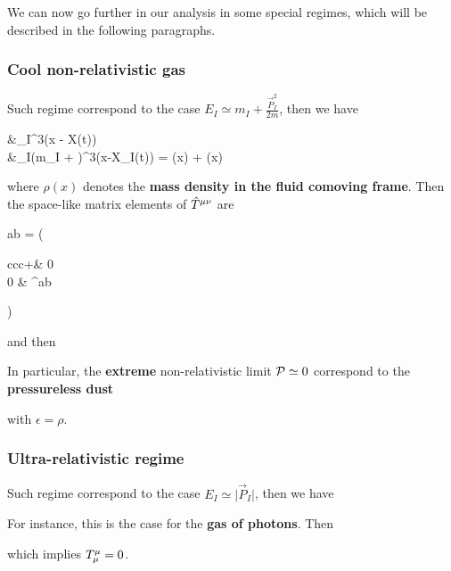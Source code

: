\documentclass[../main/main.tex]{subfiles}
\begin{document}
We can now go further in our analysis in some special regimes, which will be described in the following paragraphs.

\subsubsection{Cool non-relativistic gas}

\newcommand{\nRel}{\text{\tiny non-rel}}
\newcommand{\Dust}{\text{\tiny dust}}

Such regime correspond to the case $E_I \simeq m_I+\frac{\vec P_I^2}{2m}$, then we have
\begin{eqalign}
	\press &\simeq {}\sum_I\delta^3(\hat x - \hat X(t))\\
	\epsilon &\simeq \sum_I(m_I + )\delta^3(x-\hat X_I(t)) = \rho(x) + \press(x)
\end{eqalign}
where $\rho(x)$ denotes the \textbf{mass density in the fluid comoving frame}. Then the space-like matrix elements of $\hat T^{\mu \nu}$ are
\begin{eqalign}
	\hiemt ab = \left(\begin{array}{ccc}\rho+\press & 0 \\0 & \press\delta^{ab} \end{array}\right)
\end{eqalign}
and then
\begin{eqalign}\boxed{
	\iemt\mu\nu_{\nRel} \simeq(\rho+\frac52\press)u^\mu u^\nu+\press\imet\mu\nu
}\end{eqalign}

In particular, the \textbf{extreme} non-relativistic limit $\mathcal P\simeq0$ correspond to the \textbf{pressureless dust}
\begin{eqalign}\boxed{
	\imet\mu\nu_\Dust = \epsilon u^\mu u^\nu
}\end{eqalign}
with $\epsilon=\rho$.

\subsubsection{Ultra-relativistic regime}

Such regime correspond to the case $E_I \simeq \vert\vec P_I\vert$, then we have
\begin{eqalign}\end{eqalign}
For instance, this is the case for the \textbf{gas of photons}. Then
\begin{eqalign}\end{eqalign}
which implies ${T}^{\mu}_{\mu}=0$. 
\end{document}
